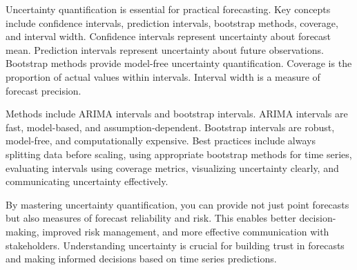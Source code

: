 Uncertainty quantification is essential for practical forecasting. Key concepts include confidence intervals, prediction intervals, bootstrap methods, coverage, and interval width. Confidence intervals represent uncertainty about forecast mean. Prediction intervals represent uncertainty about future observations. Bootstrap methods provide model-free uncertainty quantification. Coverage is the proportion of actual values within intervals. Interval width is a measure of forecast precision.

Methods include ARIMA intervals and bootstrap intervals. ARIMA intervals are fast, model-based, and assumption-dependent. Bootstrap intervals are robust, model-free, and computationally expensive. Best practices include always splitting data before scaling, using appropriate bootstrap methods for time series, evaluating intervals using coverage metrics, visualizing uncertainty clearly, and communicating uncertainty effectively.

By mastering uncertainty quantification, you can provide not just point forecasts but also measures of forecast reliability and risk. This enables better decision-making, improved risk management, and more effective communication with stakeholders. Understanding uncertainty is crucial for building trust in forecasts and making informed decisions based on time series predictions.

